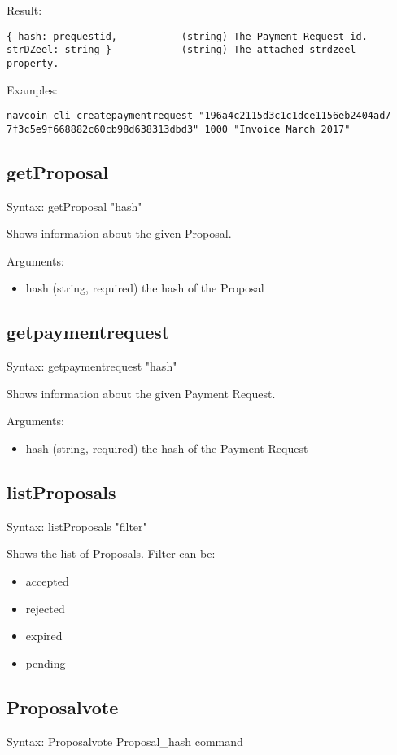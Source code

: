 \documentclass{artikel1}
\begin{document}
\begin{flushleft}
Result:
\begin{lstlisting}
{ hash: prequestid,           (string) The Payment Request id.
strDZeel: string }            (string) The attached strdzeel
property.
\end{lstlisting}

Examples:
\begin{lstlisting}
navcoin-cli createpaymentrequest "196a4c2115d3c1c1dce1156eb2404ad7
7f3c5e9f668882c60cb98d638313dbd3" 1000 "Invoice March 2017"
\end{lstlisting}
\subsection{getProposal}
Syntax: getProposal "hash"

Shows information about the given Proposal.

Arguments:
\begin{itemize}
	\item hash   (string, required) the hash of the Proposal
\end{itemize}
\subsection{getpaymentrequest}
Syntax: getpaymentrequest "hash"

Shows information about the given Payment Request.

Arguments:
\begin{itemize}
	\item hash   (string, required) the hash of the Payment Request
\end{itemize}
\subsection{listProposals}
Syntax: listProposals "filter"

Shows the list of Proposals. Filter can be:
\begin{itemize}
	\item accepted
	\item rejected
	\item expired
	\item pending
\end{itemize}

\subsection{Proposalvote}
Syntax: Proposalvote Proposal\_hash command


\end{flushleft}
\end{document}
